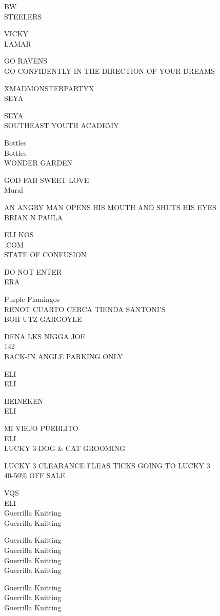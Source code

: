 \documentclass[10pt,letterpaper]{article}
\begin{document}
BW\\
STEELERS

VICKY\\
LAMAR

GO RAVENS\\
GO CONFIDENTLY IN THE DIRECTION OF YOUR DREAMS

XMADMONSTERPARTYX\\
SEYA

SEYA\\
SOUTHEAST YOUTH ACADEMY

Bottles\\
Bottles\\
WONDER GARDEN

GOD FAB SWEET LOVE\\
Mural

AN ANGRY MAN OPENS HIS MOUTH AND SHUTS HIS EYES\\
BRIAN N PAULA

ELI KOS\\
.COM\\
STATE OF CONFUSION

DO NOT ENTER\\
ERA

Purple Flamingos\\
RENOT CUARTO CERCA TIENDA SANTONI'S\\
BOH UTZ GARGOYLE

DENA LKS NIGGA JOE\\
142\\
BACK{-}IN ANGLE PARKING ONLY

ELI\\
ELI

HEINEKEN\\
ELI

MI VIEJO PUEBLITO\\
ELI\\
LUCKY 3 DOG \& CAT GROOMING

LUCKY 3 CLEARANCE FLEAS TICKS GOING TO LUCKY 3\\
40{-}50\% OFF SALE

VQS\\
ELI\\
Guerrilla Knitting\\
Guerrilla Knitting

Guerrilla Knitting\\
Guerrilla Knitting\\
Guerrilla Knitting\\
Guerrilla Knitting

Guerrilla Knitting\\
Guerrilla Knitting\\
Guerrilla Knitting
\end{document}
